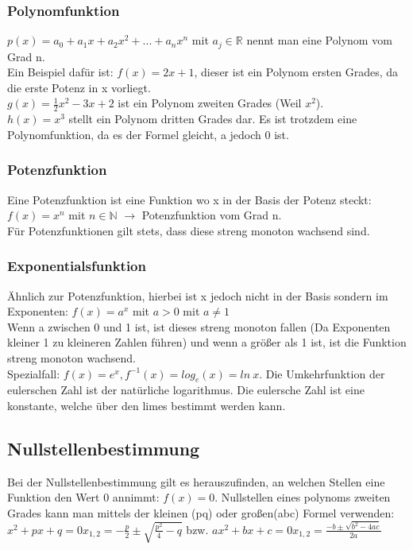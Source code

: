 \documentclass{article}
\newcommand{\N}{\mathbb{N}}
\newcommand{\R}{\mathbb{R}}
\begin{document}
	\subsubsection{Polynomfunktion}
	$p(x)=a_0+a_1x+a_2x^2+...+a_nx^n$ mit $a_j \in \R$ nennt man eine Polynom vom Grad n.\\
	Ein Beispiel dafür ist: $f(x)=2x+1$, dieser ist ein Polynom ersten Grades, da die erste Potenz in x vorliegt. \\
	$g(x)=\frac{1}{2}x^2-3x+2$ ist ein Polynom zweiten Grades (Weil $x^2$). \\
	$h(x)=x^3$ stellt ein Polynom dritten Grades dar. Es ist trotzdem eine Polynomfunktion, da es der Formel gleicht, a jedoch 0 ist. \subsubsection{Potenzfunktion}
	Eine Potenzfunktion ist eine Funktion wo x in der Basis der Potenz steckt: $f(x)=x^n$ mit $n\in \N$ $\to$ Potenzfunktion vom Grad n. \\
	Für Potenzfunktionen gilt stets, dass diese streng monoton wachsend sind. 
	\subsubsection{Exponentialsfunktion}
	Ähnlich zur Potenzfunktion, hierbei ist x jedoch nicht in der Basis sondern im Exponenten: $f(x)=a^x$ mit $a>0$ mit $a\ne 1$ \\
	Wenn a zwischen 0 und 1 ist, ist dieses streng monoton fallen (Da Exponenten kleiner 1 zu kleineren Zahlen führen) und wenn a größer als 1 ist, ist die Funktion streng monoton wachsend. \\
	Spezialfall: $f(x)=e^x, f^{-1}(x)=log_e(x) = ln\ x$. Die Umkehrfunktion der eulerschen Zahl ist der natürliche logarithmus. Die eulersche Zahl ist eine konstante, welche über den limes bestimmt werden kann.
	\subsection{Nullstellenbestimmung}
	Bei der Nullstellenbestimmung gilt es herauszufinden, an welchen Stellen eine Funktion den Wert 0 annimmt: $f(x)=0$. Nullstellen eines polynoms zweiten Grades kann man mittels der kleinen (pq) oder großen(abc) Formel verwenden: $x^2+px+q=0 $\to$ x_{1,2}=-\frac{p}{2} \pm \sqrt{\frac{p^2}{4}-q}$ bzw. $ax^2+bx+c=0 $\to$ x_{1,2}=\frac{-b \pm \sqrt{b^2 -4ac}}{2a}$
\end{document}
